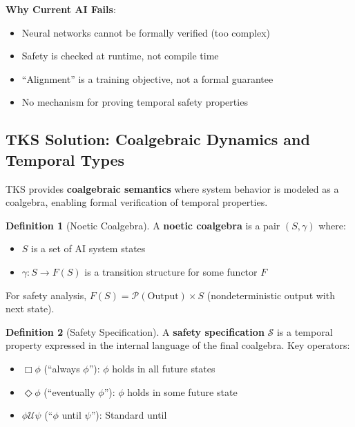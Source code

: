 \documentclass[11pt,twoside]{article}
\theoremstyle{definition}
\newtheorem{definition}{Definition}[section]
\theoremstyle{plain}
\theoremstyle{remark}
\newcommand{\SafetySpec}{\mathcal{S}}
\begin{document}
\textbf{Why Current AI Fails}:
\begin{itemize}
  \item Neural networks cannot be formally verified (too complex)
  \item Safety is checked at runtime, not compile time
  \item ``Alignment'' is a training objective, not a formal guarantee
  \item No mechanism for proving temporal safety properties
\end{itemize}

\subsection{TKS Solution: Coalgebraic Dynamics and Temporal Types}

TKS provides \textbf{coalgebraic semantics} where system behavior is modeled as a
coalgebra, enabling formal verification of temporal properties.

\begin{definition}[Noetic Coalgebra]
\label{def:noetic-coalgebra}
A \textbf{noetic coalgebra} is a pair $(S, \gamma)$ where:
\begin{itemize}
  \item $S$ is a set of AI system states
  \item $\gamma : S \to F(S)$ is a transition structure for some functor $F$
\end{itemize}
For safety analysis, $F(S) = \mathcal{P}(\mathrm{Output}) \times S$ (nondeterministic
output with next state).
\end{definition}

\begin{definition}[Safety Specification]
\label{def:safety-spec}
A \textbf{safety specification} $\SafetySpec$ is a temporal property expressed in the
internal language of the final coalgebra. Key operators:
\begin{itemize}
  \item $\Box \phi$ (``always $\phi$''): $\phi$ holds in all future states
  \item $\Diamond \phi$ (``eventually $\phi$''): $\phi$ holds in some future state
  \item $\phi \mathbin{\mathcal{U}} \psi$ (``$\phi$ until $\psi$''): Standard until
\end{itemize}
\end{definition}
\end{document}
